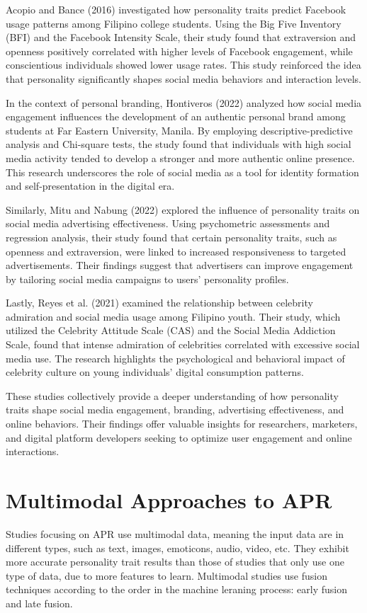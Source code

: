 Acopio and Bance (2016) investigated how personality traits predict Facebook usage patterns among Filipino college students. Using the Big Five Inventory (BFI) and the Facebook Intensity Scale, their study found that extraversion and openness positively correlated with higher levels of Facebook engagement, while conscientious individuals showed lower usage rates. This study reinforced the idea that personality significantly shapes social media behaviors and interaction levels.

In the context of personal branding, Hontiveros (2022) analyzed how social media engagement influences the development of an authentic personal brand among students at Far Eastern University, Manila. By employing descriptive-predictive analysis and Chi-square tests, the study found that individuals with high social media activity tended to develop a stronger and more authentic online presence. This research underscores the role of social media as a tool for identity formation and self-presentation in the digital era.

Similarly, Mitu and Nabung (2022) explored the influence of personality traits on social media advertising effectiveness. Using psychometric assessments and regression analysis, their study found that certain personality traits, such as openness and extraversion, were linked to increased responsiveness to targeted advertisements. Their findings suggest that advertisers can improve engagement by tailoring social media campaigns to users' personality profiles.

Lastly, Reyes et al. (2021) examined the relationship between celebrity admiration and social media usage among Filipino youth. Their study, which utilized the Celebrity Attitude Scale (CAS) and the Social Media Addiction Scale, found that intense admiration of celebrities correlated with excessive social media use. The research highlights the psychological and behavioral impact of celebrity culture on young individuals’ digital consumption patterns.

These studies collectively provide a deeper understanding of how personality traits shape social media engagement, branding, advertising effectiveness, and online behaviors. Their findings offer valuable insights for researchers, marketers, and digital platform developers seeking to optimize user engagement and online interactions.

\section{Multimodal Approaches to APR}
\label{sec: MMApproaches}
Studies focusing on APR use multimodal data, meaning the input data are in different types, such as text, images, emoticons, audio, video, etc. They exhibit more accurate personality trait results than those of studies that only use one type of data, due to more features to learn. Multimodal studies use fusion techniques according to the order in the machine leraning process: early fusion and late fusion.

